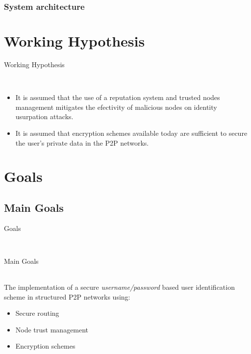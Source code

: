\documentclass[12pt]{beamer}
\renewcommand{\frametitle}[1]{\vspace{0.2cm}\begin{huge}#1\end{huge}\\}
\renewcommand{\framesubtitle}[1]{\vspace{0.4cm} \hspace{0.4cm}\begin{large}#1\end{large}\\}
\begin{document}
  \subsubsection{System architecture}

  \section{Working Hypothesis}
    \begin{frame}
    \frametitle{Working Hypothesis}
      \begin{itemize}
          \item It is assumed that the use of a reputation system and trusted nodes
            management mitigates the efectivity of malicious nodes on identity
            usurpation attacks.
          \item It is assumed that encryption schemes available today are
            sufficient to secure the user's private data in the P2P networks.
      \end{itemize}
    \end{frame}

  \section{Goals}
  \subsection{Main Goals}
    \begin{frame}
    \frametitle{Goals}
    \framesubtitle{Main Goals}
    The implementation of a secure \textit{username/password} based user identification scheme in structured P2P
    networks using:
    \begin{itemize}
      \item  Secure routing
      \item  Node trust management 
      \item  Encryption schemes
    \end{itemize}
    \end{frame}
\end{document}
